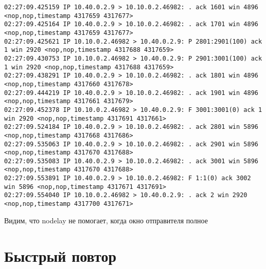 \documentclass[a4paper,12pt]{article}
\begin{document}
\begin{Verbatim}
02:27:09.425159 IP 10.40.0.2.9 > 10.10.0.2.46982: . ack 1601 win 4896 <nop,nop,timestamp 4317659 4317677>
02:27:09.425164 IP 10.40.0.2.9 > 10.10.0.2.46982: . ack 1701 win 4896 <nop,nop,timestamp 4317659 4317677>
02:27:09.425621 IP 10.10.0.2.46982 > 10.40.0.2.9: P 2801:2901(100) ack 1 win 2920 <nop,nop,timestamp 4317688 4317659>
02:27:09.430753 IP 10.10.0.2.46982 > 10.40.0.2.9: P 2901:3001(100) ack 1 win 2920 <nop,nop,timestamp 4317688 4317659>
02:27:09.438291 IP 10.40.0.2.9 > 10.10.0.2.46982: . ack 1801 win 4896 <nop,nop,timestamp 4317660 4317678>
02:27:09.444219 IP 10.40.0.2.9 > 10.10.0.2.46982: . ack 1901 win 4896 <nop,nop,timestamp 4317661 4317679>
02:27:09.452378 IP 10.10.0.2.46982 > 10.40.0.2.9: F 3001:3001(0) ack 1 win 2920 <nop,nop,timestamp 4317691 4317661>
02:27:09.524184 IP 10.40.0.2.9 > 10.10.0.2.46982: . ack 2801 win 5896 <nop,nop,timestamp 4317668 4317686>
02:27:09.535063 IP 10.40.0.2.9 > 10.10.0.2.46982: . ack 2901 win 5896 <nop,nop,timestamp 4317670 4317688>
02:27:09.535083 IP 10.40.0.2.9 > 10.10.0.2.46982: . ack 3001 win 5896 <nop,nop,timestamp 4317670 4317688>
02:27:09.553891 IP 10.40.0.2.9 > 10.10.0.2.46982: F 1:1(0) ack 3002 win 5896 <nop,nop,timestamp 4317671 4317691>
02:27:09.554040 IP 10.10.0.2.46982 > 10.40.0.2.9: . ack 2 win 2920 <nop,nop,timestamp 4317700 4317671>
\end{Verbatim}

Видим, что nodelay не помогает, когда окно отправителя полное

\section{Быстрый повтор}
\end{document}
